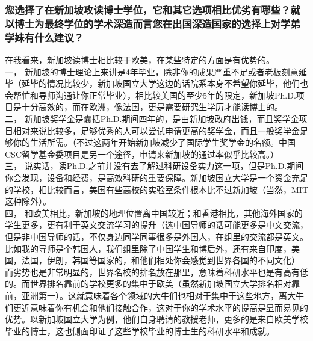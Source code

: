 \documentclass[a4paper,UTF8]{book}
\begin{document}
    \subsubsection*{您选择了在新加坡攻读博士学位，它和其它选项相比优劣有哪些？就以博士为最终学位的学术深造而言您在出国深造国家的选择上对学弟学妹有什么建议？}
    在我看来，新加坡读博士相比较于欧美，在某些特定的方面是有优势的。\\
    一， 新加坡的博士理论上来讲是4年毕业，除非你的成果严重不足或者老板刻意延毕（延毕的情况比较少，新加坡国立大学这边的话院系本身不希望你延毕，他们也会帮忙和导师沟通让你正常毕业），相比较美国的至少5年的限定，新加坡Ph.D.项目是十分高效的，而在欧洲，像法国，更是需要研究生学历才能读博士的。\\
    二， 新加坡奖学金是囊括Ph.D.期间四年的，是由新加坡政府出钱，而且奖学金项目相对来说比较多，足够优秀的人可以尝试申请更高的奖学金，而且一般奖学金足够你的生活所需。（不过这两年开始新加坡减少了国际学生奖学金的名额。中国CSC留学基金委项目是另一个途径，申请来新加坡的通过率似乎比较高。）\\
    三， 说实话，读Ph.D.之前并没有去了解过科研设备实力这一项，但是Ph.D.期间你会发现，设备和经费，是高效科研的重要保障。新加坡国立大学是一个资金充足的学校，相比较而言，美国有些高校的实验室条件根本比不过新加坡（当然，MIT这种除外）。\\
    四， 和欧美相比，新加坡的地理位置离中国较近；和香港相比，其他海外国家的学生更多，更有利于英文交流学习的提升（选中国导师的话可能更多是中文交流，但是非中国导师的话，不仅身边同学同事很多是外国人，在组里的交流都是英文。比如我的导师是个韩国人，我们组里除了中国学生和博后外，还有来自印度，美国，法国，伊朗，韩国等国家的，和他们相处你会感觉到世界各国的不同文化）\\
    而劣势也是非常明显的，世界名校的排名放在那里，意味着科研水平也是有高有低的。而世界排名靠前的学校更多的集中于欧美（虽然新加坡国立大学排名相对靠前，亚洲第一）。这就意味着各个领域的大牛们也相对于集中于这些地方，离大牛们更近意味着你有机会和他们接触合作，这对于你的学术水平的提高是显而易见的优势。以新加坡国立大学为例，他们自身聘请的教授老师，更多的是来自欧美学校毕业的博士，这也侧面印证了这些学校毕业的博士生的科研水平和成就。
\end{document}
